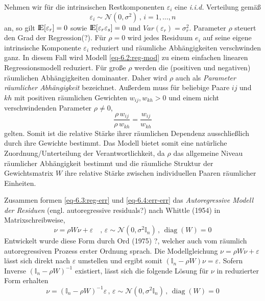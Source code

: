 Nehmen wir für die intrinsischen Restkomponenten $\varepsilon_{i}$ eine \emph{i.i.d.} Verteilung gemäß 
\begin{equation} \label{eq-6.4:err-err}
    \varepsilon_{i} \sim \mathcal{N}(0,\sigma^{2}) \, , \, i=1,\ldots,n
\end{equation}  
an, so gilt ${\rm I\!E}[\varepsilon_{r}]=0$ sowie ${\rm I\!E}[\varepsilon_{r}\varepsilon_{s}]=0$ 
und $Var(\varepsilon_{r})=\sigma_{r}^{2}$. 
Parameter $\rho$ steuert den Grad der Regression(?). 
Für $\rho = 0$ wird jedes Residuum $e_{i}$ auf seine eigene intrinsische 
Komponente $\varepsilon_{i}$ reduziert und räumliche Abhängigkeiten verschwinden ganz. 
In diesem Fall wird Modell \eqref{eq-6.2:reg-mod} zu einem einfachen linearen Regressionsmodell reduziert.
Für große $\rho$ werden die (positiven und negativen) räumlichen 
Abhängigkeiten dominanter. Daher wird $\rho$ auch als \emph{Parameter räumlicher Abhängigkeit} 
bezeichnet. 
Außerdem muss für beliebige Paare $ij$ und $kh$ mit positiven räumlichen 
Gewichten $w_{ij},w_{kh}>0$ und einem nicht verschwindenden Parameter $\rho \neq 0$, 
\begin{equation*}
    \frac{\rho \, w_{ij}}{\rho \, w_{kh}} = \frac{w_{ij}}{w_{kh}}
\end{equation*}
gelten. Somit ist die relative Stärke ihrer räumlichen Dependenz ausschließlich durch ihre Gewichte bestimmt.
Das Modell bietet somit eine natürliche Zuordnung/Unterteilung der Verantwortlichkeit, 
da $\rho$ das allgemeine Niveau räumlicher Abhängigkeit bestimmt und die räumliche 
Struktur der Gewichtsmatrix $W$ ihre relative Stärke zwischen individuellen Paaren räumlicher Einheiten.

Zusammen formen \eqref{eq-6.3:reg-err} und \eqref{eq-6.4:err-err} 
das \emph{Autoregressive Modell der Residuen} (engl. autoregressive residuals?) nach Whittle (1954)
in Matrixschreibweise, 
\begin{equation}\label{eq-6.5:reg-vec}
    \nu=\rho W \nu + \varepsilon \quad , \, \varepsilon \sim \mathcal{N}(0,\sigma^{2} \mathds{I}_{n}) \, , 
    \, \operatorname{diag}(W)=0
\end{equation}
Entwickelt wurde diese Form durch Ord (1975) ?, welcher auch vom 
räumlich autoregressiven Prozess erster Ordnung sprach.
Die Modellgleichung $\nu=\rho W \nu + \varepsilon$ lässt sich direkt nach $\varepsilon$ 
umstellen und ergibt somit $(\mathds{I}_{n} -\rho W) \nu =\varepsilon$. 
Sofern Inverse $(\mathds{I}_{n} -\rho W)^{-1}$ existiert, lässt sich die 
folgende Lösung für $\nu$ in reduzierter Form erhalten
\begin{equation} \label{eq-6.6:reg-red}
    \nu=(\mathds{I}_{n} -\rho W)^{-1} \varepsilon \, , \, 
    \varepsilon \sim \mathcal{N}(0,\sigma^{2} \mathds{I}_{n}) \, , \, \operatorname{diag}(W)=0
\end{equation}


